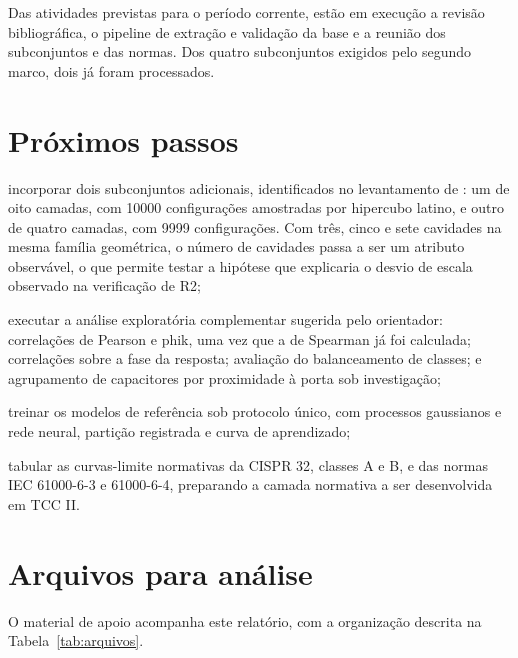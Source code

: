 Das atividades previstas para o período corrente, estão em execução a revisão
bibliográfica, o pipeline de extração e validação da base e a reunião dos
subconjuntos e das normas. Dos quatro subconjuntos exigidos pelo segundo marco,
dois já foram processados.

\section{Próximos passos}
\label{sec:proximos}

\begin{alineas}
\item incorporar dois subconjuntos adicionais, identificados no levantamento de
\citet{hillebrecht2025}: um de oito camadas, com 10000 configurações amostradas
por hipercubo latino, e outro de quatro camadas, com 9999 configurações. Com
três, cinco e sete cavidades na mesma família geométrica, o número de cavidades
passa a ser um atributo observável, o que permite testar a hipótese que
explicaria o desvio de escala observado na verificação de R2;

\item executar a análise exploratória complementar sugerida pelo orientador:
correlações de Pearson e phik, uma vez que a de Spearman já foi calculada;
correlações sobre a fase da resposta; avaliação do balanceamento de classes; e
agrupamento de capacitores por proximidade à porta sob investigação;

\item treinar os modelos de referência sob protocolo único, com processos
gaussianos e rede neural, partição registrada e curva de aprendizado;

\item tabular as curvas-limite normativas da CISPR 32, classes A e B, e das
normas IEC 61000-6-3 e 61000-6-4, preparando a camada normativa a ser
desenvolvida em TCC II.
\end{alineas}

\section{Arquivos para análise}
\label{sec:arquivos}

O material de apoio acompanha este relatório, com a organização descrita na
Tabela~\ref{tab:arquivos}.

